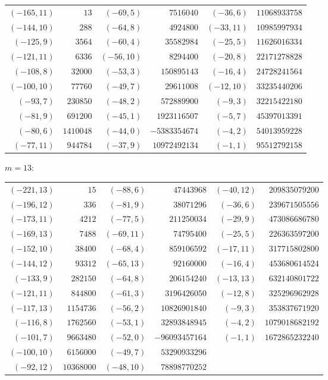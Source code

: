 {\small\begin{tabular}{@{}r@{\ \ }r@{\qquad}r@{\ \ }r@{\qquad}r@{\ \ }r@{}}
$(-165,11)$ & $13$ & $(-69,5)$ & $7516040$ & $(-36,6)$ & $11068933758$ \\
$(-144,10)$ & $288$ & $(-64,8)$ & $4924800$ & $(-33,11)$ & $10985997934$ \\
$(-125,9)$ & $3564$ & $(-60,4)$ & $35582984$ & $(-25,5)$ & $11626016334$ \\
$(-121,11)$ & $6336$ & $(-56,10)$ & $8294400$ & $(-20,8)$ & $22171278828$ \\
$(-108,8)$ & $32000$ & $(-53,3)$ & $150895143$ & $(-16,4)$ & $24728241564$ \\
$(-100,10)$ & $77760$ & $(-49,7)$ & $29611008$ & $(-12,10)$ & $33235440206$ \\
$(-93,7)$ & $230850$ & $(-48,2)$ & $572889900$ & $(-9,3)$ & $32215422180$ \\
$(-81,9)$ & $691200$ & $(-45,1)$ & $1923116507$ & $(-5,7)$ & $45397013391$ \\
$(-80,6)$ & $1410048$ & $(-44,0)$ & $-5383354674$ & $(-4,2)$ & $54013959228$ \\
$(-77,11)$ & $944784$ & $(-37,9)$ & $10972492134$ & $(-1,1)$ & $95512792158$ \\
\end{tabular}}\par\medskip
\noindent$m=13$:\nopagebreak\\[2pt]
{\small\begin{tabular}{@{}r@{\ \ }r@{\qquad}r@{\ \ }r@{\qquad}r@{\ \ }r@{}}
$(-221,13)$ & $15$ & $(-88,6)$ & $47443968$ & $(-40,12)$ & $209835079200$ \\
$(-196,12)$ & $336$ & $(-81,9)$ & $38071296$ & $(-36,6)$ & $239671505556$ \\
$(-173,11)$ & $4212$ & $(-77,5)$ & $211250034$ & $(-29,9)$ & $473086686780$ \\
$(-169,13)$ & $7488$ & $(-69,11)$ & $74795400$ & $(-25,5)$ & $226363597200$ \\
$(-152,10)$ & $38400$ & $(-68,4)$ & $859106592$ & $(-17,11)$ & $317715802800$ \\
$(-144,12)$ & $93312$ & $(-65,13)$ & $92160000$ & $(-16,4)$ & $453680614524$ \\
$(-133,9)$ & $282150$ & $(-64,8)$ & $206154240$ & $(-13,13)$ & $632140801722$ \\
$(-121,11)$ & $844800$ & $(-61,3)$ & $3196426050$ & $(-12,8)$ & $325296962928$ \\
$(-117,13)$ & $1154736$ & $(-56,2)$ & $10826901840$ & $(-9,3)$ & $353837671920$ \\
$(-116,8)$ & $1762560$ & $(-53,1)$ & $32893848945$ & $(-4,2)$ & $1079018682192$ \\
$(-101,7)$ & $9663480$ & $(-52,0)$ & $-96093457164$ & $(-1,1)$ & $1672865232240$ \\
$(-100,10)$ & $6156000$ & $(-49,7)$ & $53290933296$ & & \\
$(-92,12)$ & $10368000$ & $(-48,10)$ & $78898770252$ & & \\
\end{tabular}}\par\medskip

